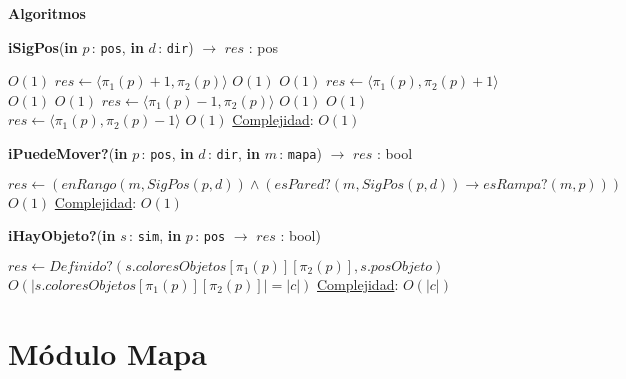 \documentclass[a4paper,10pt]{article}
\let\TipoVariable=\texttt
\let\ModificadorArgumento=\textbf
\newcommand{\In}[2]{\ModificadorArgumento{in} \ensuremath{#1}\,: \TipoVariable{#2}\xspace}
\newenvironment{Algoritmos}{%
  \vspace*{2ex}%
  \noindent\textbf{\Large Algoritmos}%
  \vspace*{2ex}%
}{}
\begin{document}
\begin{Algoritmos}
\begin{algorithm}[H]{\textbf{iSigPos}(\In{p}{pos}, \In{d}{dir}) $\to$ $res$ : pos}
      \begin{algorithmic}[1]
                                                                \Comment $O(1)$                 
            \State $res \gets \langle \pi_{1}(p) + 1, \pi_{2}(p) \rangle $          \Comment $O(1)$  
        \EndIf 
                                                               \Comment $O(1)$
            \State $res \gets \langle \pi_{1}(p), \pi_{2}(p) + 1 \rangle $          \Comment $O(1)$
        \EndIf 
                                                                 \Comment $O(1)$  
            \State $res \gets \langle \pi_{1}(p) - 1, \pi_{2}(p) \rangle $          \Comment $O(1)$
        \EndIf
                                                             \Comment $O(1)$
            \State $res \gets \langle \pi_{1}(p), \pi_{2}(p) - 1 \rangle $          \Comment $O(1)$
        \EndIf   
      \medskip
      \Statex \underline{Complejidad}: $O(1)$
      \end{algorithmic}
\end{algorithm} 


\begin{algorithm}[H]{\textbf{iPuedeMover?}(\In{p}{pos}, \In{d}{dir}, \In{m}{mapa}) $\to$ $res$ : bool}
      \begin{algorithmic}[1]
       \State $res \gets (enRango(m, SigPos(p, d)) \land (esPared?(m, SigPos(p, d)) \rightarrow esRampa?(m, p)))$    \Comment $O(1)$
      \medskip
      \Statex \underline{Complejidad}: $O(1)$
      \end{algorithmic}
\end{algorithm} 

\begin{algorithm}[H]{\textbf{iHayObjeto?}(\In{s}{sim}, \In{p}{pos} $\to$ $res$ : bool)}
      \begin{algorithmic}[1]
       \State $res \gets Definido?(s.coloresObjetos[\pi_{1}(p)][\pi_{2}(p)], s.posObjeto)$ \Comment $O(|s.coloresObjetos[\pi_{1}(p)][\pi_{2}(p)]| = |c|)$
      \medskip
      \Statex \underline{Complejidad}: $O(|c|)$
      \end{algorithmic}
\end{algorithm} 

  
\end{Algoritmos}

\newpage

\section{Módulo Mapa}
\end{document}
